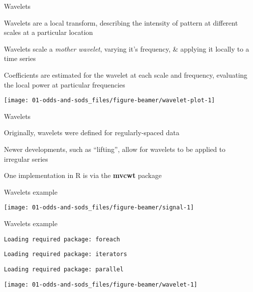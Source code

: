 \documentclass[11pt,ignorenonframetext,compress, aspectratio=169]{beamer}
\begin{document}
\begin{frame}{Wavelets}

Wavelets are a local transform, describing the intensity of pattern at
different scales at a particular location

Wavelets scale a \emph{mother wavelet}, varying it's frequency, \&
applying it locally to a time series

Coefficients are estimated for the wavelet at each scale and frequency,
evaluating the local power at particular frequencies

\begin{center}\texttt{[image: 01-odds-and-sods\_files/figure-beamer/wavelet-plot-1]} \end{center}

\end{frame}

\begin{frame}{Wavelets}

Originally, wavelets were defined for regularly-spaced data

Newer developments, such as ``lifting'', allow for wavelets to be
applied to irregular series

One implementation in R is via the \textbf{mvcwt} package

\end{frame}

\begin{frame}{Wavelets example}

\begin{center}\texttt{[image: 01-odds-and-sods\_files/figure-beamer/signal-1]} \end{center}

\end{frame}

\begin{frame}[fragile]{Wavelets example}

\begin{verbatim}
Loading required package: foreach
\end{verbatim}

\begin{verbatim}
Loading required package: iterators
\end{verbatim}

\begin{verbatim}
Loading required package: parallel
\end{verbatim}

\begin{center}\texttt{[image: 01-odds-and-sods\_files/figure-beamer/wavelet-1]} \end{center}

\end{frame}
\end{document}
